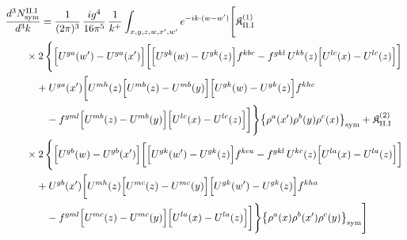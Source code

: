 \begin{align}\label{eq:H-II.I-3}
&\frac{d^{3}N^{\rm II.I}_{{\rm sym}}}{d^{3}k}=\frac{1}{(2\pi)^{3}}\, \frac{ig^{4}}{16\pi^{5}}\, \frac{1}{k^{+}} \int_{x,y,z,w,x',w'}e^{-ik\cdot(w-w')}\Bigg[ \mathfrak{K}^{(1)}_{\rm II.I}\notag\\
&\quad\quad \times 2\, \Bigg\{\Big[U^{ga}(w')-U^{ga}(x')\Big]\bigg[\Big[U^{gk}(w)-U^{gk}(z)\Big]f^{kbc} -f^{gkl}\, U^{kb}(z)\Big[U^{lc}(x)-U^{lc}(z)\Big]\bigg]\notag\\
&\quad\quad\quad +U^{ga}(x')\bigg[U^{mh}(z)\Big[U^{mb}(z)-U^{mb}(y)\Big]\Big[U^{gk}(w)-U^{gk}(z)\Big]f^{khc}\notag\\
&\quad\quad\quad\quad -f^{gml}\Big[U^{mb}(z)-U^{mb}(y)\Big]\Big[U^{lc}(x)-U^{lc}(z)\Big]\bigg]\Bigg\}\big\{\rho^{a}(x')\rho^{b}(y)\rho^{c}(x)\big\}_{\rm sym} + \mathfrak{K}^{(2)}_{\rm II.I}\notag\\
&\quad\quad \times 2\, \Bigg\{\Big[U^{gb}(w)-U^{gb}(x')\Big]\bigg[\Big[U^{gk}(w')-U^{gk}(z)\Big]f^{kca} -f^{gkl}\, U^{kc}(z)\Big[U^{la}(x)-U^{la}(z)\Big]\bigg]\notag\\
&\quad\quad\quad +U^{gb}(x')\bigg[U^{mh}(z)\Big[U^{mc}(z)-U^{mc}(y)\Big]\Big[U^{gk}(w')-U^{gk}(z)\Big]f^{kha}\notag\\
&\quad\quad\quad\quad -f^{gml}\Big[U^{mc}(z)-U^{mc}(y)\Big]\Big[U^{la}(x)-U^{la}(z)\Big]\bigg]\Bigg\}\big\{\rho^{a}(x)\rho^{b}(x')\rho^{c}(y)\big\}_{\rm sym}\Bigg]
\end{align}
